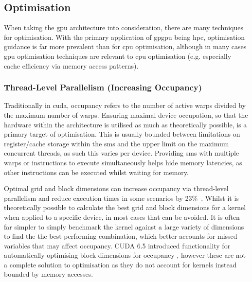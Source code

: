     \subsection{Optimisation}
      When taking the \gls{gpu} architecture into consideration, there are many techniques for optimisation. With the primary application of \gls{gpgpu} being \gls{hpc}, optimisation guidance is far more prevalent than for \gls{cpu} optimisation, although in many cases \gls{gpu} optimisation techniques are relevant to \gls{cpu} optimisation (e.g. especially cache efficiency via memory access patterns).
      
      
      \subsubsection*{Thread-Level Parallelism (Increasing Occupancy)}
        Traditionally in \gls{cuda}, occupancy refers to the number of active warps divided by the maximum number of warps. Ensuring maximal device occupation, so that the hardware within the architecture is utilised as much as theoretically possible, is a primary target of optimisation. This is usually bounded between limitations on register/cache storage within the \glspl{sm} and the upper limit on the maximum concurrent threads, as such this varies per device. Providing \glspl{sm} with multiple warps or instructions to execute simultaneously helps hide memory latencies, as other instructions can be executed whilst waiting for memory.

        Optimal grid and block dimensions can increase occupancy via thread-level parallelism and reduce execution times in some scenarios by 23\%\ \cite{TGD13}. Whilst it is theoretically possible to calculate the best grid and block dimensions for a kernel when applied to a specific device, in most cases that can be avoided. It is often far simpler to simply benchmark the kernel against a large variety of dimensions to find the the best performing combination, which better accounts for missed variables that may affect occupancy. CUDA 6.5 introduced functionality for automatically optimising block dimensions for occupancy \cite{NV_OCCUPANCY}, however these are not a complete solution to optimisation as they do not account for kernels instead bounded by memory accesses.

